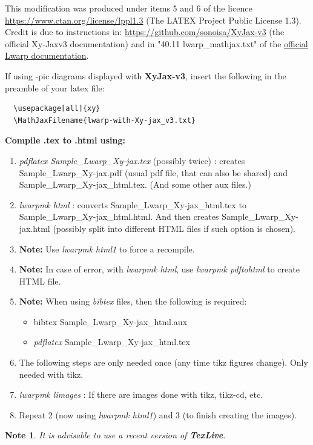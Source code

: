 \documentclass[a4paper,12pt]{article}
\newtheorem*{Note}{Note}
\newtheorem{Fundamental Theorem}{Fundamental Theorem}
\begin{document}
\noindent This modification was produced under items 5 and 6 of the licence \url{https://www.ctan.org/license/lppl1.3}  (The LATEX Project Public License 1.3).
\\
Credit is  due to instructions in: \url{https://github.com/sonoisa/XyJax-v3} (the official Xy-Jaxv3 documentation) and in  "40.11 lwarp\_mathjax.txt" of the \href{http://mirrors.ibiblio.org/CTAN/macros/latex/contrib/lwarp/lwarp.pdf}{official Lwarp documentation}.


\bigskip

 If using \Xy-pic diagrams displayed with {\textbf{XyJax-v3}}, insert the following in the preamble of your latex file:
\begin{verbatim}
  \usepackage[all]{xy}
  \MathJaxFilename{lwarp-with-Xy-jax_v3.txt}
\end{verbatim}


\textbf{Compile .tex to .html using:}

\begin{enumerate}
 \item  \emph{pdflatex Sample\_Lwarp\_Xy-jax.tex} (possibly twice) : creates Sample\_Lwarp\_Xy-jax.pdf  (usual pdf file, that can also be shared) and Sample\_Lwarp\_Xy-jax\_html.tex. (And some other aux files.)
\item  \emph{lwarpmk html} : converts Sample\_Lwarp\_Xy-jax\_html.tex  to Sample\_Lwarp\_Xy-jax\_html.html. And then creates Sample\_Lwarp\_Xy-jax.html (possibly split into different HTML files if such option is chosen).
\item[] \qquad \textbf{Note:} Use \emph{lwarpmk html1} to force a recompile.
\item[] \qquad \textbf{Note:} In case of error, with \emph{lwarpmk html}, use \emph{lwarpmk pdftohtml} to create HTML file.
\item[] \qquad \textbf{Note:} When using \emph{bibtex} files, then the following is required:  \begin{itemize}\item  bibtex  {Sample\_Lwarp\_Xy-jax\_html.aux} \item \emph{pdflatex} Sample\_Lwarp\_Xy-jax\_html.tex\end{itemize}

\item[] The following steps are only needed once (any time tikz figures change). Only needed with tikz.
\item  \emph{lwarpmk limages}  : If there are images done with tikz, tikz-cd, etc.
\item  Repeat 2 (now using \emph{lwarpmk html1}) and 3 (to finish creating the images).
\end{enumerate}
\begin{Note}It is advisable to use a recent version of \emph{\textbf{TexLive}.}\end{Note}
\end{document}
